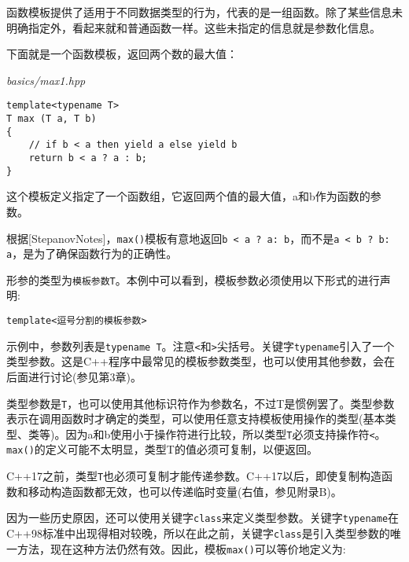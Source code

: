 

函数模板提供了适用于不同数据类型的行为，代表的是一组函数。除了某些信息未明确指定外，看起来就和普通函数一样。这些未指定的信息就是参数化信息。


下面就是一个函数模板，返回两个数的最大值：

\noindent
\textit{basics/max1.hpp}
\begin{lstlisting}[style=styleCXX]
template<typename T>
T max (T a, T b)
{
	// if b < a then yield a else yield b
	return b < a ? a : b;
}
\end{lstlisting}

这个模板定义指定了一个函数组，它返回两个值的最大值，a和b作为函数的参数。

\begin{tcolorbox}[colback=webgreen!5!white,colframe=webgreen!75!black]
\hspace*{0.75cm}根据[StepanovNotes]，\texttt{max()}模板有意地返回\texttt{b < a ? a: b}，而不是\texttt{a < b ? b: a}，是为了确保函数行为的正确性。
\end{tcolorbox}

形参的类型为\texttt{模板参数T}。本例中可以看到，模板参数必须使用以下形式的进行声明:

\begin{lstlisting}[style=styleCXX]
template<逗号分割的模板参数>
\end{lstlisting}

示例中，参数列表是\texttt{typename T}。注意\texttt{<}和\texttt{>}尖括号。关键字\texttt{typename}引入了一个类型参数。这是C++程序中最常见的模板参数类型，也可以使用其他参数，会在后面进行讨论(参见第3章)。

类型参数是\texttt{T}，也可以使用其他标识符作为参数名，不过T是惯例罢了。类型参数表示在调用函数时才确定的类型，可以使用任意支持模板使用操作的类型(基本类型、类等)。因为a和b使用小于操作符进行比较，所以类型\texttt{T}必须支持操作符\texttt{<}。\texttt{max()}的定义可能不太明显，类型T的值必须可复制，以便返回。

\begin{tcolorbox}[colback=webgreen!5!white,colframe=webgreen!75!black]
\hspace*{0.75cm}C++17之前，类型\texttt{T}也必须可复制才能传递参数。C++17以后，即使复制构造函数和移动构造函数都无效，也可以传递临时变量(右值，参见附录B)。
\end{tcolorbox}

因为一些历史原因，还可以使用关键字\texttt{class}来定义类型参数。关键字\texttt{typename}在C++98标准中出现得相对较晚，所以在此之前，关键字\texttt{class}是引入类型参数的唯一方法，现在这种方法仍然有效。因此，模板\texttt{max()}可以等价地定义为:

